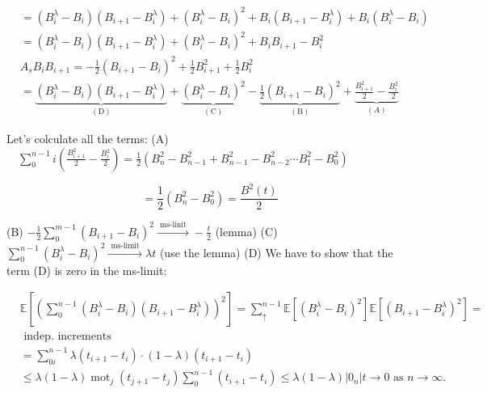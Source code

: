 $$
 \begin{aligned}
& =\left(B_{i}^{\lambda}-B_{i}\right)\left(B_{i+1}-B_{i}^{\lambda}\right)+\left(B_{i}^{\lambda}-B_{i}\right)^{2}+B_{i}\left(B_{i+1}-B_{i}^{\lambda}\right)+B_{i}\left(B_{i}^{\lambda}-B_{i}\right) \\
& =\left(B_{i}^{\lambda}-B_{i}\right)\left(B_{i+1}-B_{i}^{\lambda}\right)+\left(B_{i}^{\lambda}-B_{i}\right)^{2}+B_{i} B_{i+1}-B_{i}^{2} \\
& A_{s} B_{i} B_{i+1}=-\frac{1}{2}\left(B_{i+1}-B_{i}\right)^{2}+\frac{1}{2} B_{i+1}^{2}+\frac{1}{2} B_{i}^{2} \\
& =\underbrace{\left(B_{i}^{\lambda}-B_{i}\right)\left(B_{i+1}-B_{i}^{\lambda}\right)}_{(\text{D})}+\underbrace{\left(B_{i}^{\lambda}-B_{i}\right)^{2}}_{(\text{C})}-\underbrace{\frac{1}{2}\left(B_{i+1}-B_{i}\right)^{2}}_{(\text{B})}+\underbrace{\frac{B_{i+1}^{2}}{2}-\frac{B_{i}^{2}}{2}}_{(A)}
\end{aligned}
$$ 

Let's colculate all the terms:
(A) $\quad \sum_{0}^{n-1} i\left(\frac{B_{i+1}^{2}}{2}-\frac{B_{i}^{2}}{2}\right)=\frac{1}{2}\left(B_{n}^{2}-B_{n-1}^{2}+B_{n-1}^{2}-B_{n-2}^{2} \cdots B_{1}^{2}-B_{0}^{2}\right)$

$$
=\frac{1}{2}\left(B_{n}^{2}-B_{0}^{2}\right)=\frac{B^{2}(t)}{2}
$$ 

(B) $-\frac{1}{2} \sum_{0}^{m-1}\left(B_{i+1}-B_{i}\right)^{2} \xrightarrow{\text { ms-linit }}-\frac{t}{2}$ (lemma)
(C) $\sum_{0}^{n-1}\left(B_{i}^{\lambda}-B_{i}\right)^{2} \xrightarrow{\text { ms-limit }} \lambda t$ (use the lemma)
(D) We have to show that the term (D) is zero in the ms-limit:

$$
 \begin{aligned}
& \mathbb{E}\left[
\left(\sum_{0}^{n-1}\left(B_{i}^{\lambda}-B_{i}\right)\left(B_{i+1}-B_{i}^{\lambda}\right)\right)^{2}\right]=\sum_{\uparrow}^{n-1} \mathbb{E}\left[
\left(B_{i}^{\lambda}-B_{i}\right)^{2}\right] \mathbb{E}\left[
\left(B_{i+1}-B_{i}^{\lambda}\right)^{2}\right]=
 \\
& \text{ indep. increments } \\
& =\sum_{0 i}^{n-1} \lambda\left(t_{i+1}-t_{i}\right) \cdot(1-\lambda)\left(t_{i+1}-t_{i}\right) \\
& \leq \lambda(1-\lambda) \operatorname{mot}_{j}\left(t_{j+1}-t_{j}\right) \sum_{0}^{n-1}\left(t_{i+1}-t_{i}\right) \leq \lambda(1-\lambda)\left|0_{n}\right| t \rightarrow 0 \text{ as } n \rightarrow \infty .
\end{aligned}
$$ 

